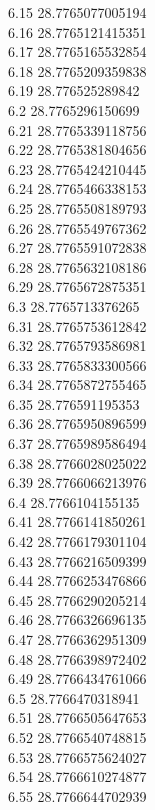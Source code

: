 {6.15	28.7765077005194\\
6.16	28.7765121415351\\
6.17	28.7765165532854\\
6.18	28.7765209359838\\
6.19	28.776525289842\\
6.2	28.7765296150699\\
6.21	28.7765339118756\\
6.22	28.7765381804656\\
6.23	28.7765424210445\\
6.24	28.7765466338153\\
6.25	28.7765508189793\\
6.26	28.7765549767362\\
6.27	28.7765591072838\\
6.28	28.7765632108186\\
6.29	28.7765672875351\\
6.3	28.7765713376265\\
6.31	28.7765753612842\\
6.32	28.7765793586981\\
6.33	28.7765833300566\\
6.34	28.7765872755465\\
6.35	28.776591195353\\
6.36	28.7765950896599\\
6.37	28.7765989586494\\
6.38	28.7766028025022\\
6.39	28.7766066213976\\
6.4	28.7766104155135\\
6.41	28.7766141850261\\
6.42	28.7766179301104\\
6.43	28.7766216509399\\
6.44	28.7766253476866\\
6.45	28.7766290205214\\
6.46	28.7766326696135\\
6.47	28.7766362951309\\
6.48	28.7766398972402\\
6.49	28.7766434761066\\
6.5	28.7766470318941\\
6.51	28.7766505647653\\
6.52	28.7766540748815\\
6.53	28.7766575624027\\
6.54	28.7766610274877\\
6.55	28.7766644702939\\
}
